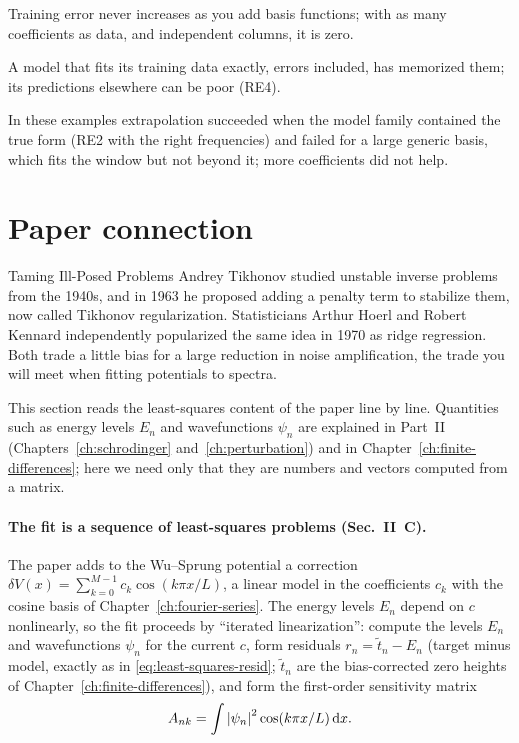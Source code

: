\begin{keyideas}
\item Training error never increases as you add basis functions; with as many coefficients as data, and independent columns, it is zero.
\item A model that fits its training data exactly, errors included, has memorized them; its predictions elsewhere can be poor (RE4).
\item In these examples extrapolation succeeded when the model family contained the true form (RE2 with the right frequencies) and failed for a large generic basis, which fits the window but not beyond it; more coefficients did not help.
\end{keyideas}

\section{Paper connection}\label{sec:least-squares-paper}
\begin{didyouknow}{Taming Ill-Posed Problems}
Andrey Tikhonov studied unstable inverse problems from the 1940s, and in 1963 he proposed adding a penalty term to stabilize them, now called Tikhonov regularization. Statisticians Arthur Hoerl and Robert Kennard independently popularized the same idea in 1970 as ridge regression. Both trade a little bias for a large reduction in noise amplification, the trade you will meet when fitting potentials to spectra.
\end{didyouknow}

This section reads the least-squares content of the paper \cite{soniR1} line by line. Quantities such as energy levels $E_n$ and wavefunctions $\psi_n$ are explained in Part~II (Chapters~\ref{ch:schrodinger} and~\ref{ch:perturbation}) and in Chapter~\ref{ch:finite-differences}; here we need only that they are numbers and vectors computed from a matrix.

\paragraph{The fit is a sequence of least-squares problems (Sec.~II~C).} The paper adds to the Wu--Sprung potential a correction $\delta V(x) = \sum_{k=0}^{M-1}c_k\cos(k\pi x/L)$, a linear model in the coefficients $c_k$ with the cosine basis of Chapter~\ref{ch:fourier-series}. The energy levels $E_n$ depend on $c$ nonlinearly, so the fit proceeds by ``iterated linearization'': compute the levels $E_n$ and wavefunctions $\psi_n$ for the current $c$, form residuals $r_n = \tilde t_n - E_n$ (target minus model, exactly as in \cref{eq:least-squares-resid}; $\tilde t_n$ are the bias-corrected zero heights of Chapter~\ref{ch:finite-differences}), and form the first-order sensitivity matrix
\[
A_{nk} = \int\left\lvert \psi_n\right\rvert^2\cos(k\pi x/L)\,\mathrm{d} x .
\]

